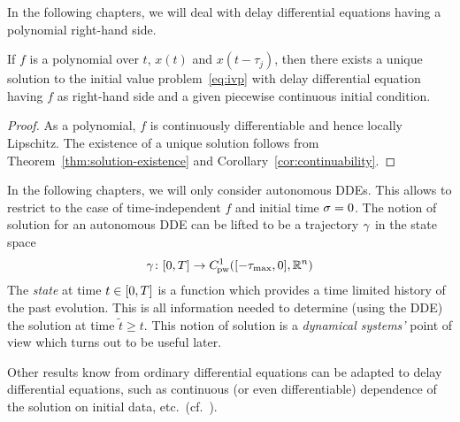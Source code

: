 
    In the following chapters, we will deal with delay differential equations having a polynomial right-hand side.
    \begin{corollary}
        If $f$ is a polynomial over $t$, $x(t)$ and $x(t-\tau_j)$, then there exists a unique solution to the initial value problem~\eqref{eq:ivp} with delay differential equation having $f$ as right-hand side and a given piecewise continuous initial condition.
    \end{corollary}
    \begin{proof}
        As a polynomial, $f$ is continuously differentiable and hence locally Lipschitz. The existence of a unique solution follows from Theorem~\ref{thm:solution-existence} and Corollary~\ref{cor:continuability}.
    \end{proof}

    In the following chapters, we will only consider autonomous DDEs. This allows to restrict to the case of time-independent $f$ and initial time $\sigma=0$.
    The notion of solution for an autonomous DDE can be lifted to be a trajectory $\gamma$ in the state space
    \begin{equation}
        \trajectory \from \compactum{0}{T} \to \statespace[-\taumax]
    \end{equation}
    The \emph{state} at time $t\in[0,T]$ is a function which provides a time limited history of the past evolution. This is all information needed to determine (using the DDE) the solution at time $\tilde{t}\geq t$.
    This notion of solution is a \emph{dynamical systems'} point of view which turns out to be useful later.

    Other results know from ordinary differential equations can be adapted to delay differential equations, such as continuous (or even differentiable) dependence of the solution on initial data, etc.\ (cf.~\cite{Dads06DDEs}).

